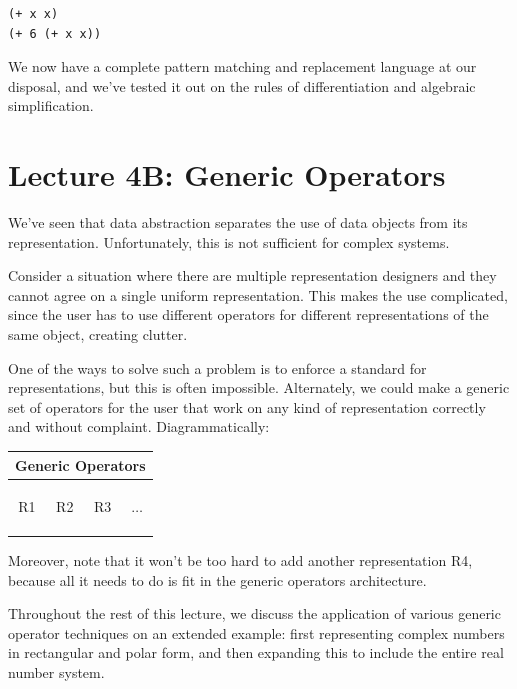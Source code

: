 \documentclass[9pt]{report}
\begin{document}
\begin{verbatim}
(+ x x)
(+ 6 (+ x x))
\end{verbatim}


We now have a complete pattern matching and replacement language at
our disposal, and we've tested it out on the rules of
differentiation and algebraic simplification.

\chapter{Lecture 4B: Generic Operators}
\label{sec:orgabc4f93}

We've seen that data abstraction separates the use of data objects
from its representation. Unfortunately, this is not sufficient for
complex systems.

Consider a situation where there are multiple representation
designers and they cannot agree on a single uniform representation.
This makes the use complicated, since the user has to use different
operators for different representations of the same object, creating
clutter.

One of the ways to solve such a problem is to enforce a standard for
representations, but this is often impossible. Alternately, we could
make a generic set of operators for the user that work on any kind
of representation correctly and without complaint. Diagrammatically:

\begin{center}
\begin{tabular}{|c|c|c|c|}
\hline
\multicolumn{4}{|c|}{Generic Operators}\\
\hline
&&&\\
&&&\\
&&&\\
R1 & R2 & R3 & $\dots$\\
&&&\\
&&&\\
&&&\\
\hline
\end{tabular}
\end{center}

Moreover, note that it won't be too hard to add another
representation R4, because all it needs to do is fit in the
generic operators architecture.

Throughout the rest of this lecture, we discuss the application of
various generic operator techniques on an extended example: first
representing complex numbers in rectangular and polar form, and then
expanding this to include the entire real number system.
\end{document}
